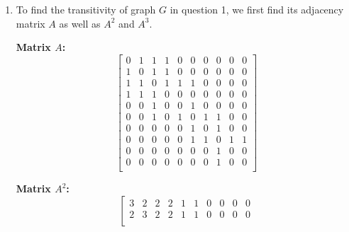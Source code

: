 \documentclass{article}
\begin{document}
    \vspace*{10pt}
    \begin{enumerate}[label=(\alph*), left=10pt, itemsep=10pt]
        \item \begin{minipage}[t]{0.9\textwidth}
                To find the transitivity of graph \(G\) in question 1, we first find its adjacency matrix
                \(A\) as well as \(A^{2}\) and \(A^{3}\).
                
                \vspace{2em}  %
                
                \begin{minipage}{0.5\linewidth}
                    \textbf{Matrix \(A\):}
                    \[
                    \left[
                    \begin{matrix}
                        0 & 1 & 1 & 1 & 0 & 0 & 0 & 0 & 0 & 0\\
                        1 & 0 & 1 & 1 & 0 & 0 & 0 & 0 & 0 & 0\\
                        1 & 1 & 0 & 1 & 1 & 1 & 0 & 0 & 0 & 0\\
                        1 & 1 & 1 & 0 & 0 & 0 & 0 & 0 & 0 & 0\\
                        0 & 0 & 1 & 0 & 0 & 1 & 0 & 0 & 0 & 0\\
                        0 & 0 & 1 & 0 & 1 & 0 & 1 & 1 & 0 & 0\\
                        0 & 0 & 0 & 0 & 0 & 1 & 0 & 1 & 0 & 0\\
                        0 & 0 & 0 & 0 & 0 & 1 & 1 & 0 & 1 & 1\\
                        0 & 0 & 0 & 0 & 0 & 0 & 0 & 1 & 0 & 0\\
                        0 & 0 & 0 & 0 & 0 & 0 & 0 & 1 & 0 & 0\\
                    \end{matrix}
                    \right]
                    \]
                \end{minipage}\hfill
                \begin{minipage}{0.5\linewidth}
                    \textbf{Matrix \(A^{2}\):}
                    \[
                    \left[
                    \begin{matrix}
                        3 & 2 & 2 & 2 & 1 & 1 & 0 & 0 & 0 & 0\\
                        2 & 3 & 2 & 2 & 1 & 1 & 0 & 0 & 0 & 0\\

\end{matrix}\]
\end{minipage}
\end{minipage}
\end{enumerate}
\end{document}

